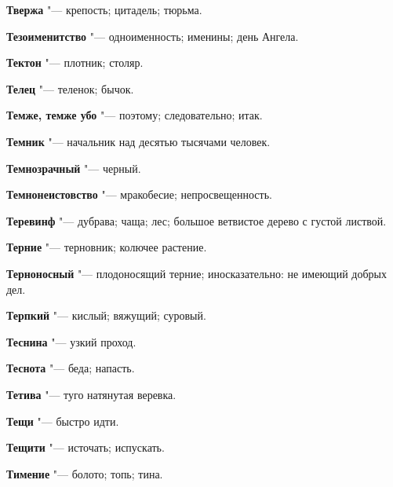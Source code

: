 \begin{mymulticols}{2}
\noindent\textbf{Твержа} "--- крепость; цитадель; тюрьма. 




\noindent\textbf{Тезоименитство} "--- одноименность; именины; день Ангела. 




\noindent\textbf{Тектон} "--- плотник; столяр. 




\noindent\textbf{Телец} "--- теленок; бычок. 




\noindent\textbf{Темже, темже убо} "--- поэтому; следовательно; итак. 




\noindent\textbf{Темник} "--- начальник над десятью тысячами человек. 




\noindent\textbf{Темнозрачный} "--- черный. 




\noindent\textbf{Темнонеистовство} "--- мракобесие; непросвещенность. 




\noindent\textbf{Теревинф} "--- дубрава; чаща; лес; большое ветвистое дерево с густой листвой. 




\noindent\textbf{Терние} "--- терновник; колючее растение. 




\noindent\textbf{Терноносный} "--- плодоносящий терние; иносказательно: не имеющий добрых дел. 




\noindent\textbf{Терпкий} "--- кислый; вяжущий; суровый. 




\noindent\textbf{Теснина} "--- узкий проход. 




\noindent\textbf{Теснота} "--- беда; напасть. 




\noindent\textbf{Тетива} "--- туго натянутая веревка. 




\noindent\textbf{Тещи} "--- быстро идти. 




\noindent\textbf{Тещити} "--- источать; испускать. 




\noindent\textbf{Тимение} "--- болото; топь; тина. 





\end{mymulticols}
